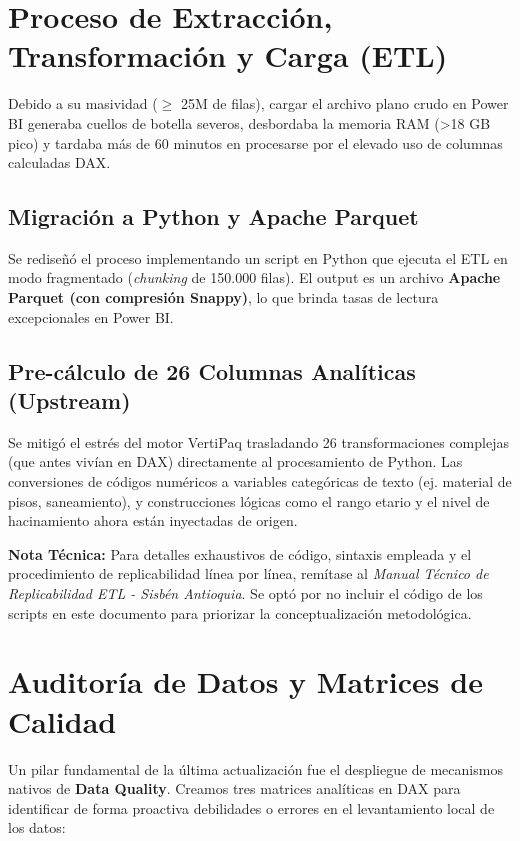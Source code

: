 \documentclass[12pt, a4paper]{article}
\begin{document}
\section{Proceso de Extracción, Transformación y Carga (ETL)}

Debido a su masividad (\(\ge\) 25M de filas), cargar el archivo plano crudo en Power BI generaba cuellos de botella severos, desbordaba la memoria RAM (\textgreater 18 GB pico) y tardaba más de 60 minutos en procesarse por el elevado uso de columnas calculadas DAX.

\subsection{Migración a Python y Apache Parquet}
Se rediseñó el proceso implementando un script en Python que ejecuta el ETL en modo fragmentado (\textit{chunking} de 150.000 filas). El output es un archivo \textbf{Apache Parquet (con compresión Snappy)}, lo que brinda tasas de lectura excepcionales en Power BI.

\subsection{Pre-cálculo de 26 Columnas Analíticas (Upstream)}
Se mitigó el estrés del motor VertiPaq trasladando 26 transformaciones complejas (que antes vivían en DAX) directamente al procesamiento de Python. Las conversiones de códigos numéricos a variables categóricas de texto (ej. material de pisos, saneamiento), y construcciones lógicas como el rango etario y el nivel de hacinamiento ahora están inyectadas de origen.

\begin{notaazul}
\textbf{Nota Técnica:} Para detalles exhaustivos de código, sintaxis empleada y el procedimiento de replicabilidad línea por línea, remítase al \textit{Manual Técnico de Replicabilidad ETL - Sisbén Antioquia}. Se optó por no incluir el código de los scripts en este documento para priorizar la conceptualización metodológica.
\end{notaazul}

\section{Auditoría de Datos y Matrices de Calidad}

Un pilar fundamental de la última actualización fue el despliegue de mecanismos nativos de \textbf{Data Quality}. Creamos tres matrices analíticas en DAX para identificar de forma proactiva debilidades o errores en el levantamiento local de los datos:
\end{document}
